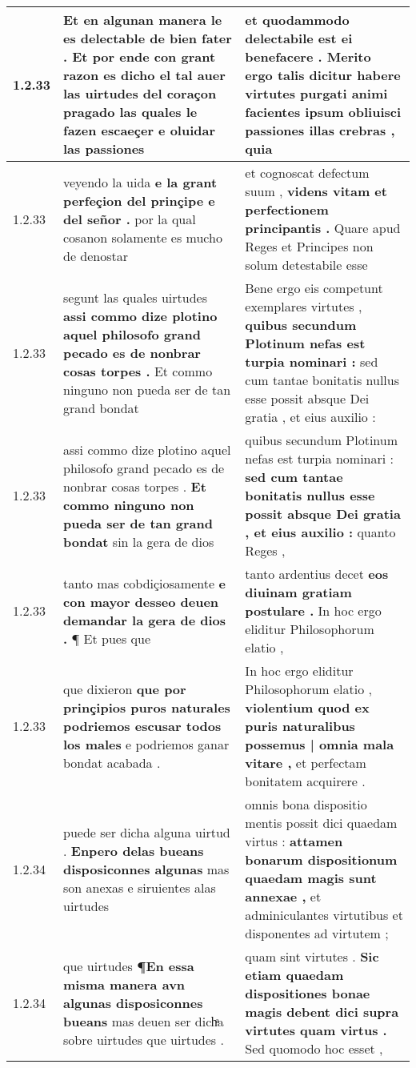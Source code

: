 \begin{tabular}{|p{1cm}|p{6.5cm}|p{6.5cm}|}
1.2.33 & Et en algunan manera le es delectable de bien fater . \textbf{ Et por ende con grant razon es dicho el tal auer las uirtudes del coraçon pragado } las quales le fazen escaeçer e oluidar las passiones & et quodammodo delectabile est ei benefacere . \textbf{ Merito ergo talis dicitur habere virtutes purgati animi facientes ipsum obliuisci passiones illas crebras , } quia \\\hline
1.2.33 & veyendo la uida \textbf{ e la grant perfeçion del prinçipe e del señor . } por la qual cosanon solamente es mucho de denostar & et cognoscat defectum suum , \textbf{ videns vitam et perfectionem principantis . } Quare apud Reges et Principes non solum detestabile esse \\\hline
1.2.33 & segunt las quales uirtudes \textbf{ assi commo dize plotino aquel philosofo grand pecado es de nonbrar cosas torpes . } Et commo ninguno non pueda ser de tan grand bondat & Bene ergo eis competunt exemplares virtutes , \textbf{ quibus secundum Plotinum nefas est turpia nominari : } sed cum tantae bonitatis nullus esse possit absque Dei gratia , et eius auxilio : \\\hline
1.2.33 & assi commo dize plotino aquel philosofo grand pecado es de nonbrar cosas torpes . \textbf{ Et commo ninguno non pueda ser de tan grand bondat } sin la gera de dios & quibus secundum Plotinum nefas est turpia nominari : \textbf{ sed cum tantae bonitatis nullus esse possit absque Dei gratia , et eius auxilio : } quanto Reges , \\\hline
1.2.33 & tanto mas cobdiçiosamente \textbf{ e con mayor desseo deuen demandar la gera de dios . } ¶ Et pues que & tanto ardentius decet \textbf{ eos diuinam gratiam postulare . } In hoc ergo eliditur Philosophorum elatio , \\\hline
1.2.33 & que dixieron \textbf{ que por prinçipios puros naturales podriemos escusar todos los males } e podriemos ganar bondat acabada . & In hoc ergo eliditur Philosophorum elatio , \textbf{ violentium quod ex puris naturalibus possemus | omnia mala vitare , } et perfectam bonitatem acquirere . \\\hline
1.2.34 & puede ser dicha alguna uirtud . \textbf{ Enpero delas bueans disposiconnes algunas } mas son anexas e siruientes alas uirtudes & omnis bona dispositio mentis possit dici quaedam virtus : \textbf{ attamen bonarum dispositionum quaedam magis sunt annexae , } et adminiculantes virtutibus et disponentes ad virtutem ; \\\hline
1.2.34 & que uirtudes \textbf{ ¶En essa misma manera avn algunas disposiconnes bueans } mas deuen ser dichͣa sobre uirtudes que uirtudes . & quam sint virtutes . \textbf{ Sic etiam quaedam dispositiones bonae magis debent dici supra virtutes quam virtus . } Sed quomodo hoc esset , \\\hline

\end{tabular}
